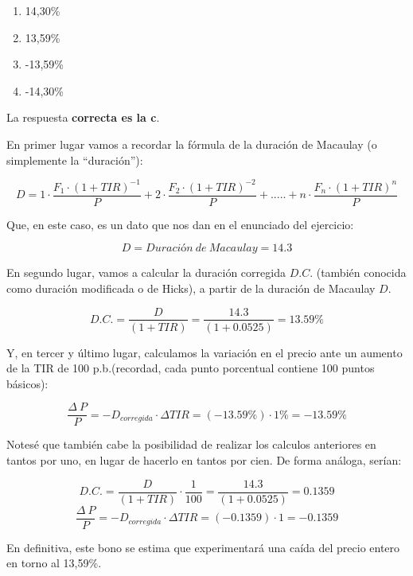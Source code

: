\documentclass[
  letterpaper,
  DIV=11,
  numbers=noendperiod]{scrreprt}
\begin{document}
\begin{tcolorbox}
\begin{enumerate}
\def\labelenumi{\alph{enumi})}
\item
  14,30\%
\item
  13,59\%
\item
  -13,59\%
\item
  -14,30\%
\end{enumerate}

\begin{tcolorbox}[enhanced jigsaw, toprule=.15mm, left=2mm, arc=.35mm, breakable, bottomrule=.15mm, opacityback=0, rightrule=.15mm, leftrule=.75mm, colframe=quarto-callout-note-color-frame, colback=white]
\begin{minipage}[t]{5.5mm}
\textcolor{quarto-callout-note-color}{\faInfo}
\end{minipage}%
\begin{minipage}[t]{\textwidth - 5.5mm}

La respuesta \textbf{correcta es la c}.

En primer lugar vamos a recordar la fórmula de la duración de Macaulay
(o simplemente la ``duración''):

\[D=1\cdot\frac{F_1\cdot\left(1+TIR\right)^{-1}}{P}+2\cdot\frac{F_2\cdot\left(1+TIR\right)^{-2}}{P}+.....+n\cdot\frac{F_n\cdot\left(1+TIR\right)^n}{P}\]

Que, en este caso, es un dato que nos dan en el enunciado del ejercicio:

\[D=Duración\ de\ Macaulay=14.3\]

En segundo lugar, vamos a calcular la duración corregida \(D.C.\)
(también conocida como duración modificada o de Hicks), a partir de la
duración de Macaulay \(D\).

\[D.C.=\frac{D}{(1+TIR)}=\frac{14.3}{(1+0.0525)}=13.59\%\]

Y, en tercer y último lugar, calculamos la variación en el precio ante
un aumento de la TIR de 100 p.b.(recordad, cada punto porcentual
contiene 100 puntos básicos):

\[\frac{\Delta\ P}{P}=-D_{corregida}\cdot\Delta TIR=(-13.59\%)\cdot 1\%=-13.59\% \]

Notesé que también cabe la posibilidad de realizar los calculos
anteriores en tantos por uno, en lugar de hacerlo en tantos por cien. De
forma análoga, serían:

\[D.C.=\frac{D}{(1+TIR)}\cdot \frac{1}{100}=\frac{14.3}{(1+0.0525)}=0.1359\]
\[\frac{\Delta\ P}{P}=-D_{corregida}\cdot\Delta TIR=(-0.1359)\cdot 1=-0.1359\]

En definitiva, este bono se estima que experimentará una caída del
precio entero en torno al 13,59\%.


\end{minipage}
\end{tcolorbox}
\end{tcolorbox}
\end{document}
